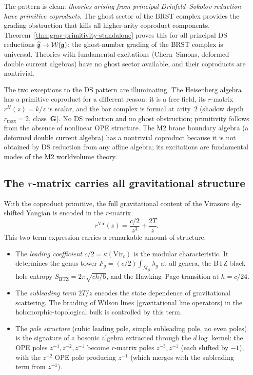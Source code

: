 The pattern is clean: \emph{theories arising from principal
Drinfeld--Sokolov reduction have primitive coproducts}. The
ghost sector of the BRST complex provides the grading obstruction
that kills all higher-arity coproduct components.
Theorem~\ref{thm:grav-primitivity-standalone} proves this for
all principal DS reductions $\widehat{\mathfrak{g}} \to \mathcal{W}(\mathfrak{g})$: the
ghost-number grading of the BRST complex is universal.
Theories with fundamental excitations (Chern--Simons, deformed
double current algebras) have no ghost sector available, and
their coproducts are nontrivial.

The two exceptions to the DS pattern are illuminating. The
Heisenberg algebra has a primitive coproduct for a different reason:
it is a free field, its $r$-matrix $r^H(z) = k/z$ is scalar, and
the bar complex is formal at arity~$2$ (shadow depth $r_{\max} = 2$,
class~$\mathbf{G}$). No DS reduction and no ghost obstruction;
primitivity follows from the absence of nonlinear OPE structure.
The M2 brane boundary algebra (a deformed double current algebra)
has a nontrivial coproduct because it is not obtained by DS
reduction from any affine algebra; its excitations are fundamental
modes of the M2 worldvolume theory.


\subsection{The \texorpdfstring{$r$}{r}-matrix carries all
gravitational structure}
\label{subsec:r-matrix-gravity}

With the coproduct primitive, the full gravitational content of
the Virasoro dg-shifted Yangian is encoded in the $r$-matrix
\begin{equation}\label{eq:grav-r-matrix}
r^{\mathrm{Vir}}(z) = \frac{c/2}{z^3} + \frac{2T}{z}.
\end{equation}
This two-term expression carries a remarkable amount of structure:
\begin{itemize}
\item The \emph{leading coefficient} $c/2 = \kappa(\mathrm{Vir}_c)$
 is the modular characteristic. It determines the genus tower
 $F_g = (c/2) \int_{\overline{\mathcal{M}}_g} \lambda_g$ at all
 genera, the BTZ black hole entropy
 $S_{\mathrm{BTZ}} = 2\pi\sqrt{ch/6}$, and the Hawking--Page
 transition at $h = c/24$.

\item The \emph{subleading term} $2T/z$ encodes the state dependence
 of gravitational scattering. The braiding of Wilson lines
 (gravitational line operators) in the holomorphic-topological
 bulk is controlled by this term.

\item The \emph{pole structure} (cubic leading pole, simple
 subleading pole, no even poles) is the signature of a
 bosonic algebra extracted through the $d\!\log$ kernel: the
 OPE poles $z^{-4}, z^{-2}, z^{-1}$ become $r$-matrix poles
 $z^{-3}, z^{-1}$ (each shifted by $-1$), with the $z^{-2}$
 OPE pole producing $z^{-1}$ (which merges with the subleading
 term from $z^{-1}$).
\end{itemize}

